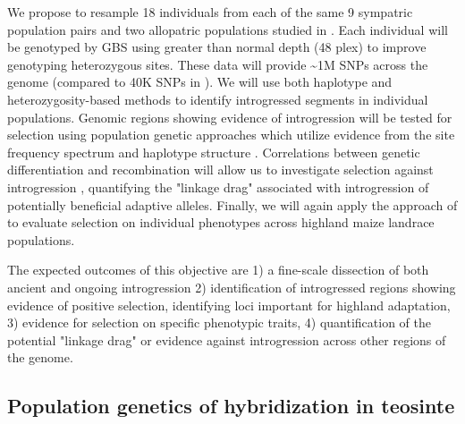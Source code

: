 We propose to resample 18 individuals from each of the same 9 sympatric population pairs and two allopatric populations studied in \citet{Hufford2013}. Each individual will be genotyped by GBS  using greater than normal depth (48 plex) to improve genotyping heterozygous sites.  These data will provide \textasciitilde 1M SNPs across the genome (compared to 40K SNPs in \citet{Hufford2013}). We will use both haplotype \citep{price2009sensitive} and heterozygosity-based \citep{Geneva2014} methods to identify introgressed segments in individual populations.  Genomic regions showing evidence of introgression will be tested for selection using population genetic approaches which utilize evidence from the site frequency spectrum \citep{nielsen2005genomic} and haplotype structure \citep{voight2006map}.  Correlations between genetic differentiation and recombination will allow us to investigate selection against introgression \citep{Brandvain2013}, quantifying the "linkage drag" associated with introgression of potentially beneficial adaptive alleles.  Finally, we will again apply the approach of \citet{Berg2013} to evaluate selection on individual phenotypes across highland maize landrace populations.

The expected outcomes of this objective are 1) a fine-scale dissection of both ancient and ongoing introgression 2) identification of introgressed regions showing evidence of positive selection, identifying loci important for highland adaptation,  3) evidence for selection on specific phenotypic traits, 4) quantification of the potential "linkage drag" or evidence against introgression across other regions of the genome.


\subsection{Population genetics of hybridization in teosinte} \label{subsec:admixpopgen}

